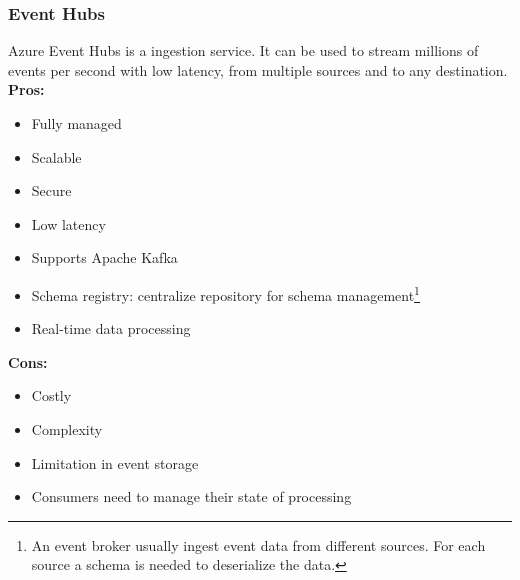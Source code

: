         \subsubsection{Event Hubs}
        \label{azure:event-hubs}
 Azure Event Hubs is a ingestion service. It can be used to stream millions of events per second with low latency, from multiple sources and to any destination.\\
        \textbf{Pros:}
        \begin{itemize}
            \item Fully managed
            \item Scalable
            \item Secure
            \item Low latency
            \item Supports Apache Kafka
            \item Schema registry: centralize repository for schema management\footnote{An event broker usually ingest event data from different sources. For each source a schema is needed to deserialize the data.}
            \item Real-time data processing
        \end{itemize}
        \textbf{Cons:}
        \begin{itemize}
            \item Costly
            \item Complexity
            \item Limitation in event storage
            \item Consumers need to manage their state of processing
        \end{itemize}

